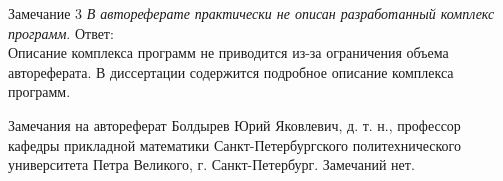 \documentclass[10pt,pdf, mathserif, hyperref={unicode}]{beamer}
\begin{document}
\begin{frame}{Замечание 3}
	\textit{В автореферате практически не описан разработанный комплекс программ}.
	\vskip 5mm
	Ответ:\\
	Описание комплекса программ не приводится из-за ограничения объема автореферата. В диссертации содержится подробное описание комплекса программ. 
\end{frame}

\begin{frame}{Замечания на автореферат}
	Болдырев Юрий Яковлевич, д. т. н., профессор кафедры прикладной математики Санкт-Петербургского политехнического университета Петра Великого, г. Санкт-Петербург.
	\vskip 5mm
	Замечаний нет.
\end{frame}
\end{document}
